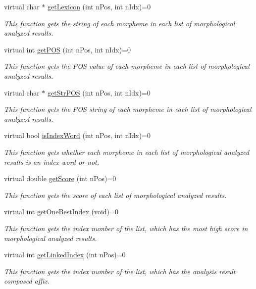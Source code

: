 \begin{CompactItemize}
virtual char $\ast$ \hyperlink{classWK__Eojul_d0799c16981e56643926838c91ad2be7}{getLexicon} (int nPos, int nIdx)=0
\begin{CompactList}\small\item\em This function gets the string of each morpheme in each list of morphological analyzed results. \item\end{CompactList}\item 
virtual int \hyperlink{classWK__Eojul_e558aad6c32e899ea725882f3bdc0896}{getPOS} (int nPos, int nIdx)=0
\begin{CompactList}\small\item\em This function gets the POS value of each morpheme in each list of morphological analyzed results. \item\end{CompactList}\item 
virtual char $\ast$ \hyperlink{classWK__Eojul_87720be1679d0d1c86c193e4c3953d00}{getStrPOS} (int nPos, int nIdx)=0
\begin{CompactList}\small\item\em This function gets the POS string of each morpheme in each list of morphological analyzed results. \item\end{CompactList}\item 
virtual bool \hyperlink{classWK__Eojul_fcffd7053b36792cbd4dcca3a0949542}{isIndexWord} (int nPos, int nIdx)=0
\begin{CompactList}\small\item\em This function gets whether each morpheme in each list of morphological analyzed results is an index word or not. \item\end{CompactList}\item 
virtual double \hyperlink{classWK__Eojul_4b7079e12cf56a9f9211c3177096c018}{getScore} (int nPos)=0
\begin{CompactList}\small\item\em This function gets the score of each list of morphological analyzed results. \item\end{CompactList}\item 
virtual int \hyperlink{classWK__Eojul_0588cf004a9d2f10cebd1d729c328abd}{getOneBestIndex} (void)=0
\begin{CompactList}\small\item\em This function gets the index number of the list, which has the most high score in morphological analyzed results. \item\end{CompactList}\item 
virtual int \hyperlink{classWK__Eojul_45b0ae73689aca02fb735332ba63150d}{getLinkedIndex} (int nPos)=0
\begin{CompactList}\small\item\em This function gets the index number of the list, which has the analysis result composed affix. \item\end{CompactList}\end{CompactItemize}
